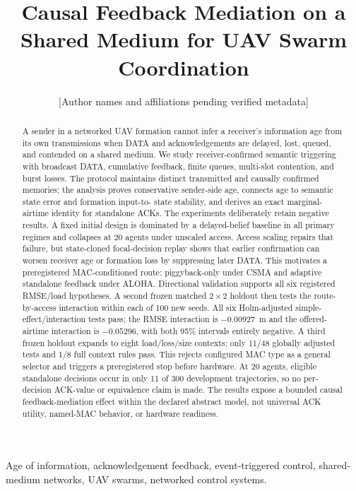 \documentclass[10pt,twocolumn,twoside]{IEEEtran}
\title{Causal Feedback Mediation on a Shared Medium for
UAV Swarm Coordination}
\author{[Author names and affiliations pending verified metadata]}
\begin{document}
\maketitle

\begin{abstract}
A sender in a networked UAV formation cannot infer a receiver's information
age from its own transmissions when DATA and acknowledgements are delayed,
lost, queued, and contended on a shared medium. We study receiver-confirmed
semantic triggering with broadcast DATA, cumulative feedback, finite queues,
multi-slot contention, and burst losses. The protocol maintains distinct
transmitted and causally confirmed memories; the analysis proves conservative
sender-side age, connects age to semantic state error and formation input-to-
state stability, and derives an exact marginal-airtime identity for standalone
ACKs. The experiments deliberately retain negative results. A fixed initial
design is dominated by a delayed-belief baseline in all primary regimes and
collapses at 20 agents under unscaled access. Access scaling repairs that
failure, but state-cloned focal-decision replay shows that earlier confirmation
can worsen receiver age or formation loss by suppressing later DATA. This
motivates a preregistered MAC-conditioned route: piggyback-only under CSMA and
adaptive standalone feedback under ALOHA. Directional validation supports all
six registered RMSE/load hypotheses. A second frozen matched $2\times2$
holdout then tests the route-by-access interaction within each of 100 new
seeds. All six Holm-adjusted simple-effect/interaction tests pass; the RMSE
interaction is $-0.00927$~m and the offered-airtime interaction is $-0.05296$,
with both 95\% intervals entirely negative. A third frozen holdout expands to
eight load/loss/size contexts; only 11/48 globally adjusted tests and 1/8 full
context rules pass. This rejects configured MAC type as a general selector and
triggers a preregistered stop before hardware. At 20 agents, eligible
standalone decisions occur in only 11 of 300
development trajectories, so no per-decision ACK-value or equivalence claim
is made. The results expose a bounded causal feedback-mediation effect within
the declared abstract model, not universal ACK utility, named-MAC behavior, or
hardware readiness.
\end{abstract}

\begin{IEEEkeywords}
Age of information, acknowledgement feedback, event-triggered control,
shared-medium networks, UAV swarms, networked control systems.
\end{IEEEkeywords}












\end{document}
